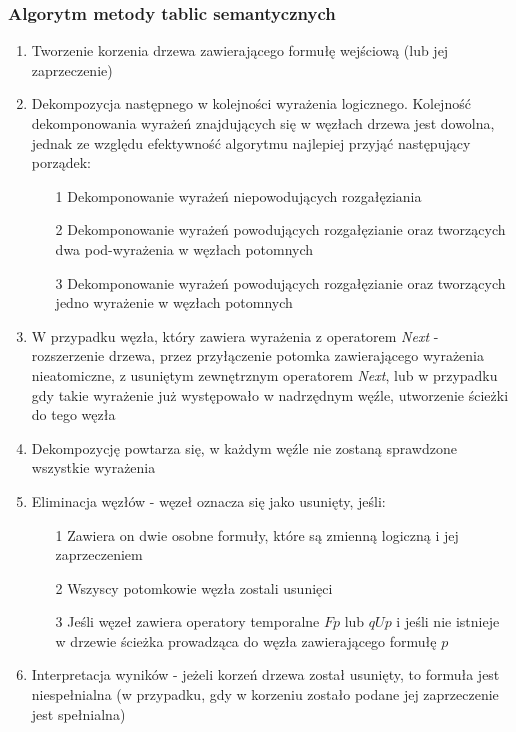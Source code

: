 \documentclass[12pt,a4paper,titlepage]{article}
\begin{document}
\subsubsection{Algorytm metody tablic semantycznych}
\begin{enumerate}
	\item Tworzenie korzenia drzewa zawierającego formułę wejściową (lub jej zaprzeczenie)
	\item Dekompozycja następnego w kolejności wyrażenia logicznego. Kolejność dekomponowania wyrażeń znajdujących się w węzłach drzewa jest dowolna, jednak ze względu efektywność algorytmu najlepiej przyjąć następujący porządek:
	\begin{itemize}
	\item[1] Dekomponowanie wyrażeń niepowodujących rozgałęziania
	\item[2] Dekomponowanie wyrażeń powodujących rozgałęzianie oraz tworzących dwa pod-wyrażenia w węzłach potomnych
	\item[3] Dekomponowanie wyrażeń powodujących rozgałęzianie oraz tworzących jedno wyrażenie w węzłach potomnych
	\end{itemize}
	\item W przypadku węzła, który zawiera wyrażenia z operatorem \textit{Next} - rozszerzenie drzewa, przez przyłączenie potomka zawierającego wyrażenia nieatomiczne, z usuniętym zewnętrznym operatorem \textit{Next}, lub w przypadku gdy takie wyrażenie już występowało w nadrzędnym węźle, utworzenie ścieżki do tego węzła
	\item Dekompozycję powtarza się, w każdym węźle nie zostaną sprawdzone wszystkie wyrażenia
	\item Eliminacja węzłów - węzeł oznacza się jako usunięty, jeśli:
	\begin{itemize}
	\item[1] Zawiera on dwie osobne formuły, które są zmienną logiczną i jej zaprzeczeniem
	\item[2] Wszyscy potomkowie węzła zostali usunięci
	\item[3] Jeśli węzeł zawiera operatory temporalne $F p$ lub $q U p$ i jeśli nie istnieje w drzewie ścieżka prowadząca do węzła zawierającego formułę $p$ 
	\end{itemize}
	\item Interpretacja wyników - jeżeli korzeń drzewa został usunięty, to formuła jest niespełnialna (w przypadku, gdy w korzeniu zostało podane jej zaprzeczenie jest spełnialna)
\end{enumerate}
\end{document}
